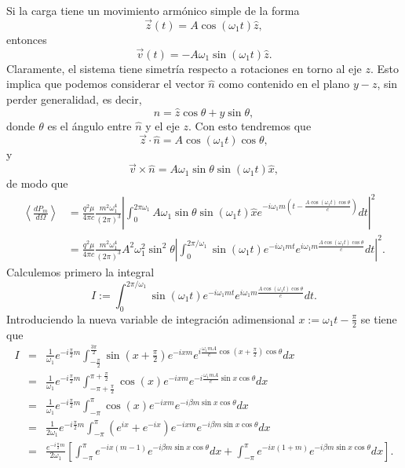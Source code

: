 Si la carga tiene un movimiento armónico simple de la forma
\begin{equation}
\vec{z}(t) =A\cos(\omega_1t)\hat{z},
\end{equation}
entonces
\begin{equation}
\vec{v}(t) =-A\omega_1\sin(\omega_1t)\hat{z}.
\end{equation}
Claramente, el sistema tiene simetría respecto a rotaciones en torno al eje
$z$. Esto implica que podemos considerar el vector $\hat{n}$ como contenido en
el plano $y-z$, sin perder generalidad, es decir,
\begin{equation}
\hat{n}=\hat{z}\cos\theta+\hat{y}\sin\theta,
\end{equation}
donde $\theta$ es el ángulo entre $\hat{n}$ y el eje $z$. Con esto tendremos
que
\begin{equation}
 \vec{z}\cdot\hat{n}=A\cos(\omega_1t)\cos\theta ,
\end{equation}
y
\begin{equation}
\vec{v}\times\hat{n}=A\omega_1\sin\theta\sin(\omega_1t)  \hat{x},
\end{equation}
de modo que
\begin{align}
\left\langle \frac{dP_{m}}{d\Omega}\right\rangle &=
\frac{q^2\mu}{4\pi c}\frac{m^2\omega_1^4}{\left(2\pi\right)^3}
\left| \int_0^{2\pi\omega_1}A\omega_1\sin\theta\sin\left(\omega_1t\right)
\hat{x}e^{-i\omega_1m\left(t-\frac{A\cos\left(\omega_1t\right)\cos\theta}{c}\right)}dt\right|^2\\
&=\frac{q^2\mu}{4\pi c}\frac{m^2\omega_1^4}{\left(2\pi\right)^3}
A^2\omega_1^2\sin^2\theta\left| \int_0^{2\pi/\omega_1}\sin\left(
\omega_1t\right) e^{-i\omega_1mt}e^{i\omega_1m\frac{A\cos\left(
\omega_1t\right)  \cos\theta}{c}}dt\right|^2 .  \label{promedioantescvar}
\end{align}
Calculemos primero la integral
\begin{equation}
I:=\int_0^{2\pi/\omega_1}\sin\left(\omega_1t\right)
e^{-i\omega_1mt}e^{i\omega_1m\frac{A\cos\left(  \omega_1t\right)
\cos\theta}{c}}dt.
\end{equation}
Introduciendo la nueva variable de integración adimensional
$x:=\omega_1t-\frac{\pi}{2}$ se tiene que
\begin{eqnarray}
I&=&\frac{1}{\omega_1}e^{-i\frac{\pi}{2}m}\int_{-\frac{\pi}{2}}^{\frac{3\pi}{2}}
\sin\left(x+\frac{\pi}{2}\right)  e^{-ixm}e^{i\frac{\omega_1mA}{c}\cos\left(
x+\frac{\pi}{2}\right)  \cos\theta}dx \\
&=&\frac{1}{\omega_1}e^{-i\frac{\pi}{2}m}\int_{-\pi+\frac{\pi}{2}}^{\pi+\frac{\pi
}{2}}\cos(x)e^{-ixm}e^{-i\frac{\omega_1mA}{c}\sin x\cos\theta}dx\\
&=&\frac{1}{\omega_1}e^{-i\frac{\pi}{2}m}\int_{-\pi}^{\pi}\cos(x)
e^{-ixm}e^{-i\beta m\sin x\cos\theta}dx\\
&=&\frac{1}{2\omega_1}e^{-i\frac{\pi}{2}m}\int_{-\pi}^{\pi}\left(
e^{ix}+e^{-ix}\right)e^{-ixm}e^{-i\beta m\sin x\cos\theta}dx\\
&=&\frac{e^{-i\frac{\pi}{2}m}}{2\omega_1}\left[\int_{-\pi}^{\pi}e^{-ix\left(
m-1\right)}e^{-i\beta m\sin x\cos\theta}dx+\int_{-\pi}^{\pi}e^{-ix\left(
1+m\right)}e^{-i\beta m\sin x\cos\theta}dx\right]  .
\end{eqnarray}
